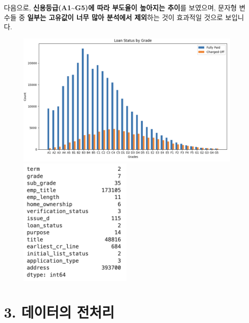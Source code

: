 \documentclass[
  a4paper,
  DIV=11,
  numbers=noendperiod]{scrreprt}
\begin{document}
다음으로, \textbf{신용등급(A1\textasciitilde G5)에 따라 부도율이
높아지는 추이}를 보였으며, 문자형 변수들 중 \textbf{일부는 고유값이 너무
많아 분석에서 제외}하는 것이 효과적일 것으로 보입니다.

\begin{figure}

\begin{minipage}{0.50\linewidth}
\begin{center}
\includegraphics{image/ml4_grade.png}
\end{center}
\end{minipage}%
%
\begin{minipage}{0.50\linewidth}
\begin{center}
\includegraphics[width=0.5\textwidth,height=\textheight]{image/ml6_category.png}
\end{center}
\end{minipage}%

\end{figure}%

\newpage

\section*{3. 데이터의
전처리}\label{uxb370uxc774uxd130uxc758-uxc804uxcc98uxb9ac}
\end{document}
